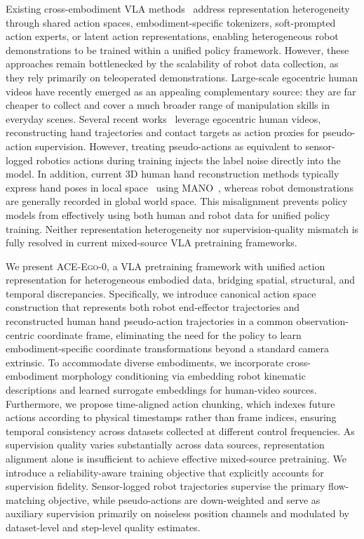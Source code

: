 \documentclass{llmxive}
\providecommand{\OURS}{\textsc{ACE-Ego-0}\xspace}
\providecommand{\Ours}{\OURS}
\begin{document}
Existing cross-embodiment VLA methods~\cite{o2024open,octo_2023,wang2024hpt,bjorck2025gr00t,zheng2025x} address representation heterogeneity through shared action spaces, embodiment-specific tokenizers, soft-prompted action experts, or latent action representations, enabling heterogeneous robot demonstrations to be trained within a unified policy framework. However, these approaches remain bottlenecked by the scalability of robot data collection, as they rely primarily on teleoperated demonstrations.
Large-scale egocentric human videos have recently emerged as an appealing complementary source: they are far cheaper to collect and cover a much broader range of manipulation skills in everyday scenes. Several recent works~\cite{bjorck2025gr00t,kareer2024egomimic,yang2025egovla,fu2024humanplus} leverage egocentric human videos, reconstructing hand trajectories and contact targets as action proxies for pseudo-action supervision. However, treating pseudo-actions as equivalent to sensor-logged robotics actions during training injects the label noise directly into the model. In addition, current 3D human hand reconstruction methods typically express hand poses in local space~\cite{pavlakos2024reconstructing,wilor} using MANO~\cite{romero2022embodied}, whereas robot demonstrations are generally recorded in global world space. This misalignment prevents policy models from effectively using both human and robot data for unified policy training. Neither representation heterogeneity nor supervision-quality mismatch is fully resolved in current mixed-source VLA pretraining frameworks.

We present \Ours, a VLA pretraining framework with unified action representation for heterogeneous embodied data, bridging spatial, structural, and temporal discrepancies. Specifically, we introduce canonical action space construction that represents both robot end-effector trajectories and reconstructed human hand pseudo-action trajectories in a common observation-centric coordinate frame, eliminating the need for the policy to learn embodiment-specific coordinate transformations beyond a standard camera extrinsic. To accommodate diverse embodiments, we incorporate cross-embodiment morphology conditioning via embedding robot kinematic descriptions and learned surrogate embeddings for human-video sources. Furthermore, we propose time-aligned action chunking, which indexes future actions according to physical timestamps rather than frame indices, ensuring temporal consistency across datasets collected at different control frequencies. As supervision quality varies substantially across data sources, representation alignment alone is insufficient to achieve effective mixed-source pretraining. We introduce a reliability-aware training objective that explicitly accounts for supervision fidelity. Sensor-logged robot trajectories supervise the primary flow-matching objective, while pseudo-actions are down-weighted and serve as auxiliary supervision primarily on noiseless position channels and modulated by dataset-level and step-level quality estimates. 
\end{document}
